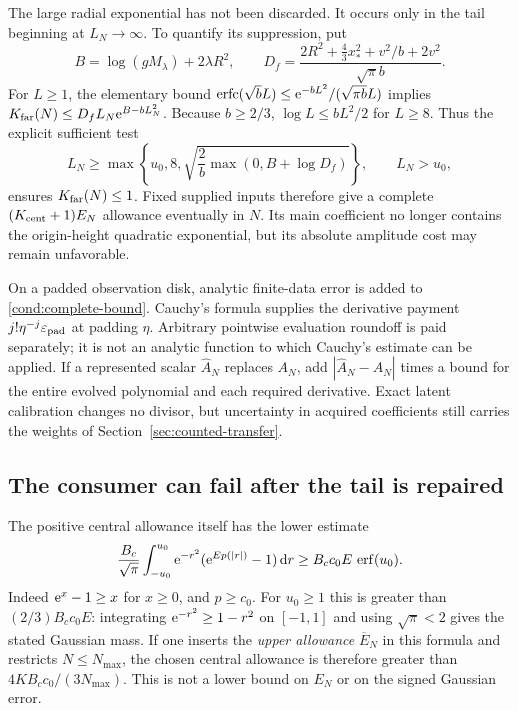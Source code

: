 The large radial exponential has not been discarded. It occurs only
in the tail beginning at $L_N\to\infty$. To quantify its suppression,
put
\[
 B=\log(gM_\lambda)+2\lambda R^2,\qquad
 D_f=\frac{2R^2+\frac43x_*^2+v^2/b+2v^2}{\sqrt\pi b}.
\]
For $L\ge1$, the elementary bound
$\operatorname{erfc}(\sqrt bL)\le
\mathrm e^{-bL^2}/(\sqrt{\pi b}L)$ implies
$K_{\rm far}(N)\le D_fL_N\mathrm e^{B-bL_N^2}$.
Because $b\ge2/3$, $\log L\le bL^2/2$ for $L\ge8$.
Thus the explicit sufficient test
\begin{equation}
 L_N\ge
 \max\!\left\{u_0,8,
       \sqrt{\frac2b\max(0,B+\log D_f)}\right\},
 \qquad L_N>u_0,
 \label{cond:far-test}
\end{equation}
ensures $K_{\rm far}(N)\le1$. Fixed supplied inputs therefore give
a complete $(K_{\rm cent}+1)E_N$ allowance eventually in $N$.
Its main coefficient no longer contains the origin-height quadratic
exponential, but its absolute amplitude cost may remain unfavorable.

On a padded observation disk, analytic finite-data error is added to
\eqref{cond:complete-bound}. Cauchy's formula supplies the derivative
payment $j!\eta^{-j}\varepsilon_{\rm pad}$ at padding $\eta$.
Arbitrary pointwise evaluation roundoff is paid separately; it is not
an analytic function to which Cauchy's estimate can be applied.
If a represented scalar $\widehat A_N$ replaces $A_N$, add
$|\widehat A_N-A_N|$ times a bound for the entire evolved polynomial
and each required derivative. Exact latent calibration changes no
divisor, but uncertainty in acquired coefficients still carries the
weights of Section~\ref{sec:counted-transfer}.

\subsection{The consumer can fail after the tail is repaired}

The positive central allowance itself has the lower estimate
\begin{equation}
 \frac{B_c}{\sqrt\pi}\int_{-u_0}^{u_0}
       \mathrm e^{-r^2}(\mathrm e^{E p(|r|)}-1)\,\mathrm d r
 \ge B_cc_0E\,\operatorname{erf}(u_0).
 \label{cond:core-floor}
\end{equation}
Indeed $\mathrm e^x-1\ge x$ for $x\ge0$, and $p\ge c_0$.
For $u_0\ge1$ this is greater than $(2/3)B_cc_0E$:
integrating $\mathrm e^{-r^2}\ge1-r^2$ on $[-1,1]$ and using
$\sqrt\pi<2$ gives the stated Gaussian mass.
If one inserts the \emph{upper allowance} $\overline E_N$ in this
formula and restricts $N\le N_{\max}$, the chosen central allowance
is therefore greater than
$4KB_cc_0/(3N_{\max})$. This is not a lower bound on $E_N$ or on
the signed Gaussian error.

